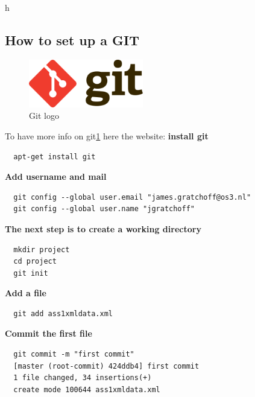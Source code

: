 h
\subsection{How to set up a GIT} 

\begin{figure}[h!]
\centering
\label{fig:Gitlogo}
\caption{Git logo}
\includegraphics[width=50mm]{images/Git.png}
\end{figure}
To have more info on git\ref{fig:Gitlogo} here the website: \cite{gitinfo}
\textbf{install git}
\begin{lstlisting}
  apt-get install git
\end{lstlisting}
\textbf{Add username and mail}
\begin{lstlisting}
  git config --global user.email "james.gratchoff@os3.nl"
  git config --global user.name "jgratchoff"
\end{lstlisting}

\textbf{The next step is to create a working directory}
\begin{lstlisting}
  mkdir project
  cd project
  git init
\end{lstlisting}

\textbf{Add a file}
\begin{lstlisting}
  git add ass1xmldata.xml
\end{lstlisting}

\textbf{Commit the first file}
\begin{lstlisting}
  git commit -m "first commit"
  [master (root-commit) 424ddb4] first commit
  1 file changed, 34 insertions(+)
  create mode 100644 ass1xmldata.xml
\end{lstlisting}

